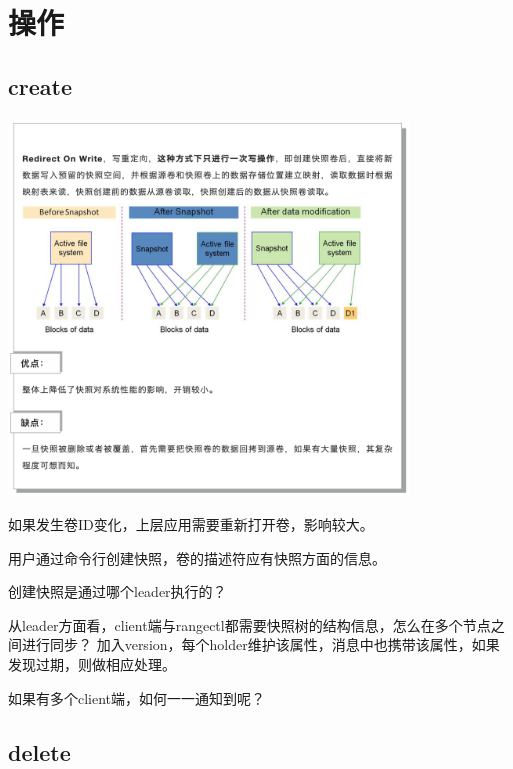 \section{操作}

\subsection{create}

\begin{center}
\includegraphics[height=10cm]{../imgs/row-snapshot.png}
\end{center}

如果发生卷ID变化，上层应用需要重新打开卷，影响较大。

用户通过命令行创建快照，卷的描述符应有快照方面的信息。

创建快照是通过哪个leader执行的？

从leader方面看，client端与rangectl都需要快照树的结构信息，怎么在多个节点之间进行同步？
加入version，每个holder维护该属性，消息中也携带该属性，如果发现过期，则做相应处理。

如果有多个client端，如何一一通知到呢？

\subsection{delete}

